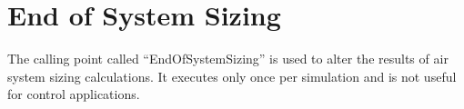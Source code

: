 \section{End of System Sizing}\label{end-of-system-sizing}

The calling point called ``EndOfSystemSizing'' is used to alter the results of air system sizing calculations. It executes only once per simulation and is not useful for control applications.
